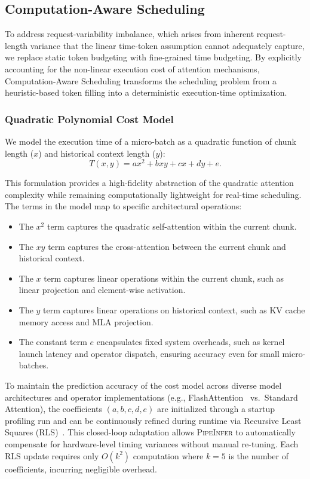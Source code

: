 \documentclass[12pt,a4paper]{article}
\newcommand{\sys}{\textsc{PipeInfer}\xspace}
\newcommand{\kvcache}{KV cache\xspace}
\newcommand{\requestimb}{request-variability imbalance\xspace}
\newcommand{\Timesched}{Computation-Aware Scheduling\xspace}
\begin{document}
\subsection{\Timesched}
\label{sec:scheduling}

To address \requestimb, which arises from inherent request-length variance that the linear time-token assumption cannot adequately capture, we replace static token budgeting with fine-grained time budgeting.
By explicitly accounting for the non-linear execution cost of attention mechanisms, \Timesched transforms the scheduling problem from a heuristic-based token filling into a deterministic execution-time optimization.

\subsubsection{Quadratic Polynomial Cost Model}

We model the execution time of a micro-batch as a quadratic function of chunk length ($x$) and historical context length ($y$):
\begin{equation}
T(x,y) = a x^2 + bxy + cx + dy + e.
\end{equation}

This formulation provides a high-fidelity abstraction of the quadratic attention complexity while remaining computationally lightweight for real-time scheduling.
The terms in the model map to specific architectural operations:
\begin{itemize}[leftmargin=*]
    \item The $x^2$ term captures the quadratic self-attention within the current chunk.
    \item The $xy$ term captures the cross-attention between the current chunk and historical context.
    \item The $x$ term captures linear operations within the current chunk, such as linear projection and element-wise activation.
    \item The $y$ term captures linear operations on historical context, such as \kvcache memory access and MLA projection.
    \item The constant term $e$ encapsulates fixed system overheads, such as kernel launch latency and operator dispatch, ensuring accuracy even for small micro-batches.
\end{itemize}

To maintain the prediction accuracy of the cost model across diverse model architectures and operator implementations (e.g., FlashAttention~\cite{flashattention} vs.\ Standard Attention), the coefficients $(a,b,c,d,e)$ are initialized through a startup profiling run and can be continuously refined during runtime via Recursive Least Squares (RLS)~\cite{haykin}.
This closed-loop adaptation allows \sys to automatically compensate for hardware-level timing variances without manual re-tuning.
Each RLS update requires only $O(k^2)$ computation where $k{=}5$ is the number of coefficients, incurring negligible overhead.
\end{document}
